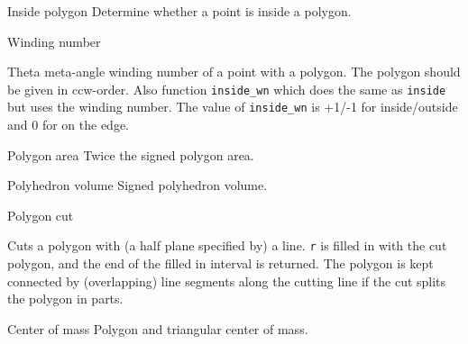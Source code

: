 \begin{algorithm}{Inside polygon}
\desc
Determine whether a point is inside a polygon. 
\end{algorithm}


\begin{algorithm}{Winding number}

\desc
Theta meta-angle winding number of a point with a polygon. The polygon should
be given in ccw-order. Also function {\tt inside\_wn} which does the same as
{\tt inside} but uses the winding number. The value of {\tt inside\_wn} is
+1/-1 for inside/outside and 0 for on the edge.
\end{algorithm}

\begin{algorithm}{Polygon area}
\desc
Twice the signed polygon area.
\end{algorithm}

\begin{algorithm}{Polyhedron volume}
\desc
Signed polyhedron volume.
\end{algorithm}

\begin{algorithm}{Polygon cut}

\desc
Cuts a polygon with (a half plane specified by) a line.
{\tt r} is filled in with the cut polygon, and the end of the filled in
interval is returned. The polygon is kept connected by (overlapping)
line segments along the cutting line if the cut splits the polygon in parts.
\end{algorithm}


\begin{algorithm}{Center of mass}
\desc
Polygon and triangular center of mass.
\end{algorithm}

